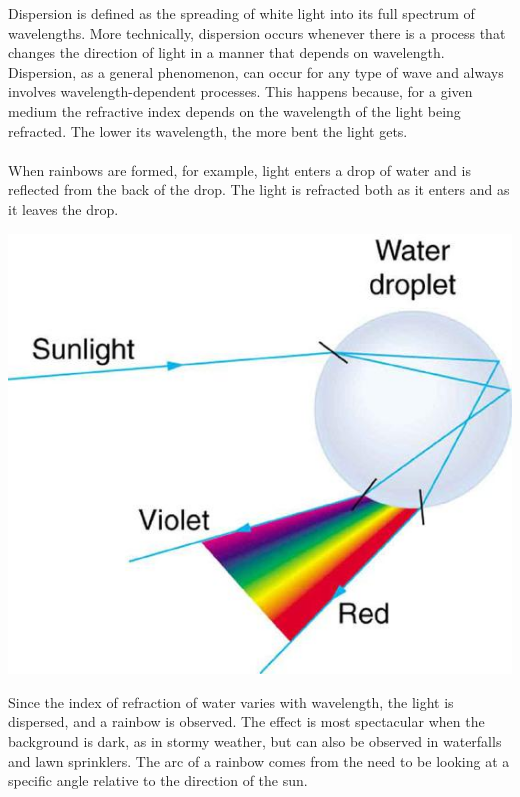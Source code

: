 \documentclass[11pt]{article}
\begin{document}
	 Dispersion is defined as the spreading of white light into its full spectrum of wavelengths. More technically, dispersion occurs whenever there is a process that changes the direction of light in a manner that depends on wavelength. Dispersion, as a general phenomenon, can occur for any type of wave and always involves wavelength-dependent processes. This happens because, for a given medium the refractive index depends on the wavelength of the light being refracted. The lower its wavelength, the more bent the light gets. \\ \\
	 When rainbows are formed, for example, light enters a drop of water and is reflected from the back of the drop. The light is refracted both as it enters and as it leaves the drop. 
	 \begin{center}
	 	\includegraphics[scale=0.3]{droplet}
	 \end{center}
	 Since the index of refraction of water varies with wavelength, the light is dispersed, and a rainbow is observed. The effect is most spectacular when the background is dark, as in stormy weather, but can also be observed in waterfalls and lawn sprinklers. The arc of a rainbow comes from the need to be looking at a specific angle relative to the direction of the sun.
\end{document}
